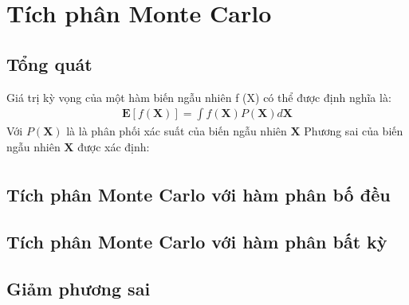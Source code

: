 \chapter{Tích phân Monte Carlo }\label{ch:2}
\section{Tổng quát}\label{sec:2.1}
Giá trị kỳ vọng của một hàm biến ngẫu nhiên f (X) có thể được định nghĩa là:
\begin{align}
	\textbf{E}[f(\textbf{X})]=\int{f(\textbf{X})P(\textbf{X})d\textbf{X}} 
\end{align}
Với $P(\textbf{X})$ là  là phân phối xác suất của biến ngẫu nhiên $\textbf{X}$ 
Phương sai của biến ngẫu nhiên $\textbf{X}$ được xác định:
\begin{align}
	
\end{align}
\section{Tích phân Monte Carlo với hàm phân bố đều}\label{sec:2.2}
\section{Tích phân Monte Carlo với hàm phân bất kỳ}\label{sec:2.3}
\section{Giảm phương sai}\label{sec:2.4}

